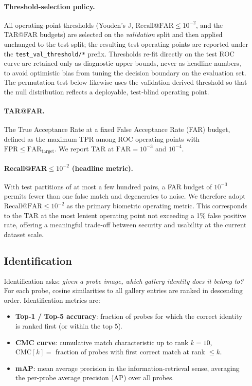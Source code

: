 \paragraph{Threshold-selection policy.}
All operating-point thresholds (Youden's J, $\mathrm{Recall@FAR}\le10^{-2}$, and the
TAR@FAR budgets) are selected on the \emph{validation} split and then applied
unchanged to the test split; the resulting test operating points are reported under
the \texttt{test\_val\_threshold/*} prefix.  Thresholds re-fit directly on the test
ROC curve are retained only as diagnostic upper bounds, never as headline numbers, to
avoid optimistic bias from tuning the decision boundary on the evaluation set.  The
permutation test below likewise uses the validation-derived threshold so that the null
distribution reflects a deployable, test-blind operating point.

\paragraph{TAR@FAR.}  The True Acceptance Rate at a fixed False Acceptance Rate (FAR) budget,
defined as the maximum TPR among ROC operating points with $\mathrm{FPR} \le
\mathrm{FAR}_{\text{target}}$.  We report TAR at $\mathrm{FAR} = 10^{-3}$ and $10^{-4}$.

\paragraph{Recall@FAR$\le 10^{-2}$ (headline metric).}
With test partitions of at most a few hundred pairs, a FAR budget of $10^{-3}$ permits
fewer than one false match and degenerates to noise.  We therefore adopt
$\mathrm{Recall@FAR} \le 10^{-2}$ as the primary biometric operating metric.  This
corresponds to the TAR at the most lenient operating point not exceeding a 1\% false
positive rate, offering a meaningful trade-off between security and usability at the
current dataset scale.

\subsection{Identification}

Identification asks: \emph{given a probe image, which gallery identity does it belong to?}
For each probe, cosine similarities to all gallery entries are ranked in descending order.
Identification metrics are:

\begin{itemize}[itemsep=2pt]
  \item \textbf{Top-1 / Top-5 accuracy}: fraction of probes for which the correct identity
        is ranked first (or within the top 5).
  \item \textbf{CMC curve}: cumulative match characteristic up to rank $k = 10$,
        $\mathrm{CMC}[k] = $ fraction of probes with first correct match at rank $\le k$.
  \item \textbf{mAP}: mean average precision in the information-retrieval sense, averaging
        the per-probe average precision (AP) over all probes.
\end{itemize}

